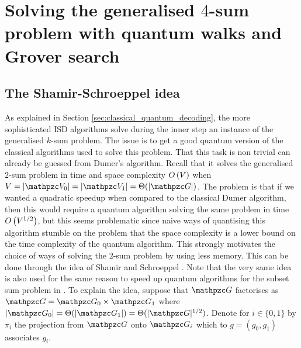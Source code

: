 {\tiny }\section{Solving the generalised $4$-sum problem with quantum walks and Grover search}

\subsection{The Shamir-Schroeppel idea}
As explained in Section \ref{sec:classical_quantum_decoding}, the more sophisticated ISD algorithms solve during the inner step 
an instance of the generalised $k$-sum problem.
The issue is to get a good quantum version of the classical algorithms used to solve this problem. That this task is non trivial can already be
guessed from Dumer's algorithm. Recall that it solves the generalised $2$-sum problem in time and space complexity $O\left( V \right)$ when 
$V=|\zV_0|=|\zV_1|=\Theta(|\zG|)$.
The problem is that if we wanted a quadratic speedup when compared to the classical Dumer algorithm,
then this would require a quantum algorithm solving the same problem in time $O\left( V^{1/2} \right)$, but this seems problematic since naive ways of quantising this algorithm 
stumble on the problem that the space complexity is a lower bound on the time complexity of the quantum algorithm.
This strongly motivates the choice of ways of solving the $2$-sum problem by using less memory. This can be done through the idea of Shamir and Schroeppel \cite{SS81}.
Note that the very same idea is also used for the same reason to 
speed up quantum algorithms for the subset sum problem in \cite[Sec. 4]{BJLM13}.
To explain the idea, suppose that $\zG$ factorises as $\zG = \zG_0 \times \zG_1$ where $|\zG_0| = \Theta(|\zG_1|)=\Theta(|\zG|^{1/2})$.
Denote for $i\in \{0,1\}$ by $\pi_i$ the projection from $\zG$ onto $\zG_i$ which to $g=(g_0,g_1)$ associates  $g_i$.

